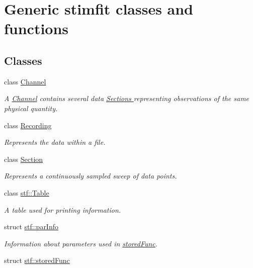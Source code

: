 \hypertarget{group__stfgen}{
\section{Generic stimfit classes and functions}
\label{group__stfgen}
}
\subsection*{Classes}
\begin{DoxyCompactItemize}
\item 
class \hyperlink{classChannel}{Channel}
\begin{DoxyCompactList}\small\item\em A \hyperlink{classChannel}{Channel} contains several data \hyperlink{classSection}{Sections } representing observations of the same physical quantity. \item\end{DoxyCompactList}\item 
class \hyperlink{classRecording}{Recording}
\begin{DoxyCompactList}\small\item\em Represents the data within a file. \item\end{DoxyCompactList}\item 
class \hyperlink{classSection}{Section}
\begin{DoxyCompactList}\small\item\em Represents a continuously sampled sweep of data points. \item\end{DoxyCompactList}\item 
class \hyperlink{classstf_1_1Table}{stf::Table}
\begin{DoxyCompactList}\small\item\em A table used for printing information. \item\end{DoxyCompactList}\item 
struct \hyperlink{structstf_1_1parInfo}{stf::parInfo}
\begin{DoxyCompactList}\small\item\em Information about parameters used in \hyperlink{structstf_1_1storedFunc}{storedFunc}. \item\end{DoxyCompactList}\item 
struct \hyperlink{structstf_1_1storedFunc}{stf::storedFunc}

\end{DoxyCompactItemize}
